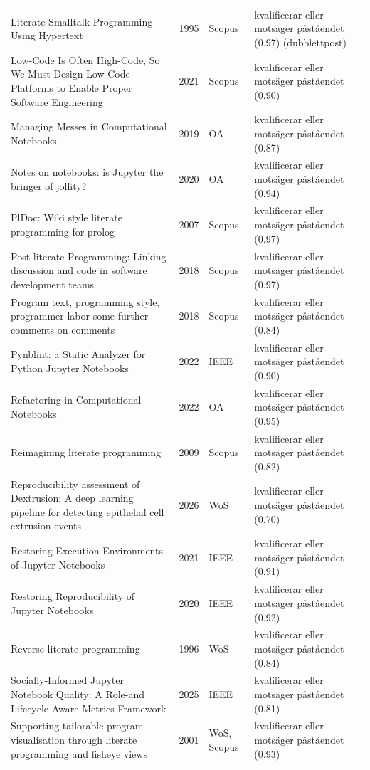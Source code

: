 \begin{longtable}{@{}%
  >{\raggedright\arraybackslash}p{}c%
  >{\raggedright\arraybackslash}p{}%
  >{\raggedright\arraybackslash}p{}@{}}
Literate Smalltalk Programming Using Hypertext & 1995 & Scopus & kvalificerar eller motsäger påståendet (0.97) (dubblettpost) \\
Low-Code Is Often High-Code, So We Must Design Low-Code Platforms to Enable Proper Software Engineering & 2021 & Scopus & kvalificerar eller motsäger påståendet (0.90) \\
Managing Messes in Computational Notebooks & 2019 & OA & kvalificerar eller motsäger påståendet (0.87) \\
Notes on notebooks: is Jupyter the bringer of jollity? & 2020 & OA & kvalificerar eller motsäger påståendet (0.94) \\
PlDoc: Wiki style literate programming for prolog & 2007 & Scopus & kvalificerar eller motsäger påståendet (0.97) \\
Post-literate Programming: Linking discussion and code in software development teams & 2018 & Scopus & kvalificerar eller motsäger påståendet (0.97) \\
Program text, programming style, programmer labor some further comments on comments & 2018 & Scopus & kvalificerar eller motsäger påståendet (0.84) \\
Pynblint: a Static Analyzer for Python Jupyter Notebooks & 2022 & IEEE & kvalificerar eller motsäger påståendet (0.90) \\
Refactoring in Computational Notebooks & 2022 & OA & kvalificerar eller motsäger påståendet (0.95) \\
Reimagining literate programming & 2009 & Scopus & kvalificerar eller motsäger påståendet (0.82) \\
Reproducibility assessment of Dextrusion: A deep learning pipeline for detecting epithelial cell extrusion events & 2026 & WoS & kvalificerar eller motsäger påståendet (0.70) \\
Restoring Execution Environments of Jupyter Notebooks & 2021 & IEEE & kvalificerar eller motsäger påståendet (0.91) \\
Restoring Reproducibility of Jupyter Notebooks & 2020 & IEEE & kvalificerar eller motsäger påståendet (0.92) \\
Reverse literate programming & 1996 & WoS & kvalificerar eller motsäger påståendet (0.84) \\
Socially-Informed Jupyter Notebook Quality: A Role-and Lifecycle-Aware Metrics Framework & 2025 & IEEE & kvalificerar eller motsäger påståendet (0.81) \\
Supporting tailorable program visualisation through literate programming and fisheye views & 2001 & WoS, Scopus & kvalificerar eller motsäger påståendet (0.93) \\

\end{longtable}
